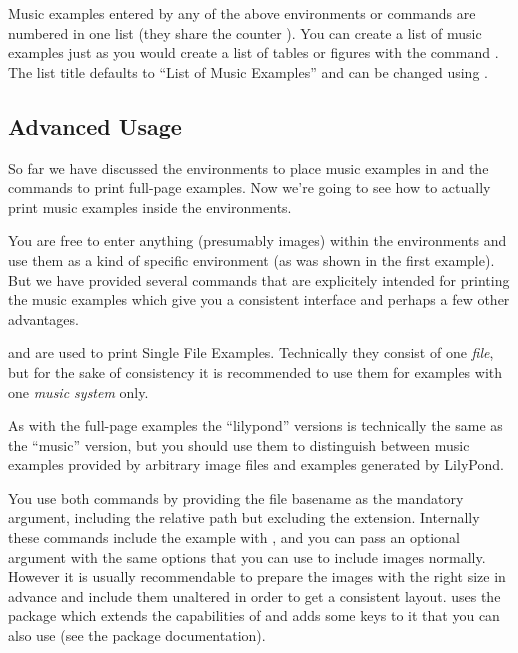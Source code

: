 \documentclass[../openLilyLib]{subfiles}
\begin{document}
\bigskip
Music examples entered by any of the above environments or commands are numbered in one list (they share the counter ).
You can create a list of music examples just as you would create a list of tables or figures with the command .
The list title defaults to “List of Music Examples” and can be changed using .


\subsection{Advanced Usage}
\label{subsec:xmp_advanced-usage}

So far we have discussed the environments to place music examples in and the commands to print full-page examples.
Now we're going to see how to actually print music examples inside the environments.

You are free to enter anything (presumably images) within the environments and use them as a kind of specific  environment (as was shown in the first example).
But we have provided several commands that are explicitely intended for printing the music examples which give you a consistent interface and perhaps a few other advantages.

 and  are used to print Single File Examples.
Technically they consist of one \emph{file}, but for the sake of consistency it is recommended to use them for examples with one \emph{music system} only.

As with the full-page examples the “lilypond” versions is technically the same as the “music” version, but you should use them to distinguish between music examples provided by arbitrary image files and examples generated by LilyPond.
\\

You use both commands by providing the file basename as the mandatory argument, including the relative path but excluding the extension.
Internally these commands include the example with , and you can pass an optional argument with the same options that you can use to include images normally.
However it is usually recommendable to prepare the images with the right size in advance and include them unaltered in order to get a consistent layout.
 uses the  package which extends the capabilities of  and adds some keys to it that you can also use (see the package documentation).
\end{document}
